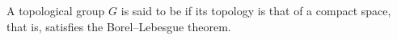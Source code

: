 A topological group $G$ is said to be  if its topology is that of a compact space, that is, satisfies the Borel--Lebesgue theorem.
